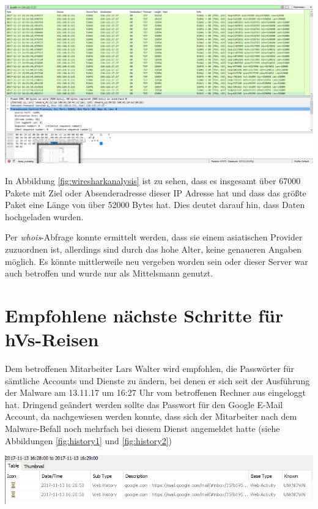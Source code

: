 \begin{center}
	\includegraphics[width=15.8cm]{figures/wiresharkanalysis.png}
	\label{fig:wiresharkanalysis}
\end{center}

In Abbildung \ref{fig:wiresharkanalysis} ist zu sehen, dass es insgesamt über 67000 Pakete mit Ziel oder Absenderadresse dieser IP Adresse hat und dass das größte Paket eine Länge von über 52000 Bytes hat. Dies deutet darauf hin, dass Daten hochgeladen wurden.

Per \textit{whois}-Abfrage konnte ermittelt werden, dass sie einem asiatischen Provider zuzuordnen ist, allerdings sind durch das hohe Alter, keine genaueren Angaben möglich. Es könnte mittlerweile neu vergeben worden sein oder dieser Server war auch betroffen und wurde nur als Mittelsmann genutzt.

\chapter{Empfohlene nächste Schritte für hVs-Reisen}

Dem betroffenen Mitarbeiter Lars Walter wird empfohlen, die Passwörter für sämtliche Accounts und Dienste zu ändern, bei denen er sich seit der Ausführung der Malware am 13.11.17 um 16:27 Uhr vom betroffenen Rechner aus eingeloggt hat.
Dringend geändert werden sollte das Passwort für den Google E-Mail Account, da nachgewiesen werden konnte, dass sich der Mitarbeiter nach dem Malware-Befall noch mehrfach bei diesem Dienst angemeldet hatte (siehe Abbildungen \ref{fig:history1} und \ref{fig:history2})

\begin{center}
	\includegraphics[width=15.8cm]{figures/history1.PNG}
	\label{fig:history1}
\end{center}

